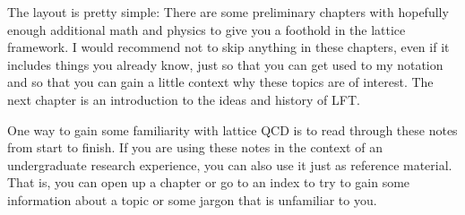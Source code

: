 \documentclass[12pt]{book}
\theoremstyle{definition}
\begin{document}
The layout is pretty simple: There are some preliminary chapters with
hopefully enough additional math and physics to give you a foothold in the lattice
framework. I would recommend not to skip anything in these chapters, even if it
includes things you already know, just so that you can get used to my notation
and so that you can gain a little context why these topics are of interest.
The next chapter is an introduction to the ideas and history of LFT.

One way to gain some familiarity with lattice QCD is to read through these
notes from start to finish. If you are using these notes in the context
of an undergraduate research experience, you can also use it just as
reference material. That is, you can open up a chapter or go to an index
to try to gain some information about a topic or some jargon that is
unfamiliar to you.

\tableofcontents                        %
\mainmatter                             %







\printindex
\end{document}

